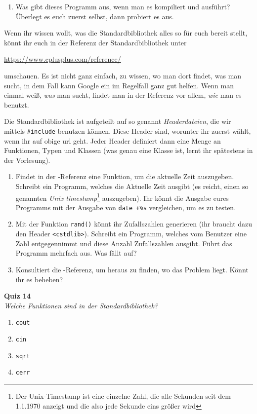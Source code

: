 \begin{praxis}
    \begin{enumerate}
        \item Was gibt dieses Programm aus, wenn man es kompiliert und ausführt?
              Überlegt es euch zuerst selbst, dann probiert es aus.
    \end{enumerate}

    Wenn ihr wissen wollt, was die Standardbibliothek alles so für euch bereit
    stellt, könnt ihr euch in der Referenz der Standardbibliothek unter

    \url{https://www.cplusplus.com/reference/}

    umschauen. Es ist nicht ganz einfach, zu wissen, wo man dort findet, was man
    sucht, in dem Fall kann Google ein im Regelfall ganz gut helfen. Wenn man
    einmal weiß, \emph{was} man sucht, findet man in der Referenz vor allem,
    \emph{wie} man es benutzt.

    Die Standardbibliothek ist aufgeteilt auf so genannt \emph{Headerdateien}, die
    wir mittels \texttt{\#include} benutzen können. Diese Header sind, worunter ihr
    zuerst wählt, wenn ihr auf obige url geht. Jeder Header definiert dann eine
    Menge an Funktionen, Typen und Klassen (was genau eine Klasse ist, lernt ihr
    spätestens in der Vorlesung).

    \begin{enumerate}[resume]
        \item Findet in der \Cpp-Referenz eine Funktion, um die aktuelle Zeit
              auszugeben. Schreibt ein Programm, welches die Aktuelle Zeit ausgibt
              (es reicht, einen so genannten \emph{Unix timestamp}\footnote{Der
                  Unix-Timestamp ist eine einzelne Zahl, die alle Sekunden seit dem
                  1.1.1970 anzeigt und die also jede Sekunde eins größer wird} auszugeben).
              Ihr könnt die Ausgabe eures Programms mit der Ausgabe von \texttt{date
                  +\%s} vergleichen, um es zu testen.
        \item Mit der Funktion \texttt{rand()} könnt ihr Zufallszahlen generieren
              (ihr braucht dazu den Header \texttt{<cstdlib>}). Schreibt ein
              Programm, welches vom Benutzer eine Zahl entgegennimmt und diese Anzahl
              Zufallszahlen ausgibt. Führt das Programm mehrfach aus. Was fällt auf?
        \item Konsultiert die \Cpp-Referenz, um heraus zu finden, wo das Problem
              liegt. Könnt ihr es beheben?
    \end{enumerate}
\end{praxis}



\newpage

\textbf{Quiz 14}\\
\textit{Welche Funktionen sind in der Standardbibliothek?}
\begin{enumerate}[label=\alph*)]
    \item \texttt{cout}
    \item \texttt{cin}
    \item \texttt{sqrt}
    \item \texttt{cerr}
\end{enumerate}

